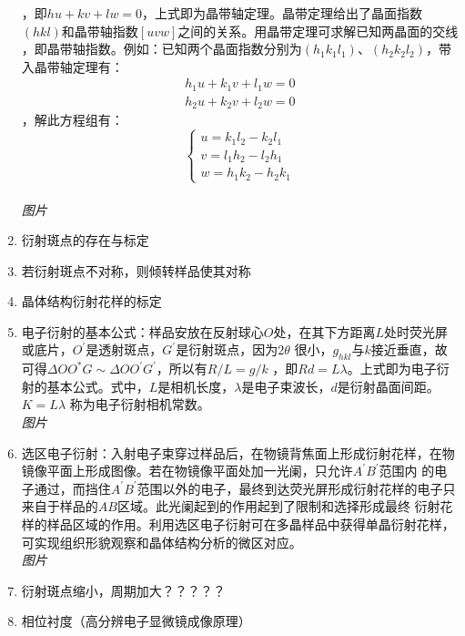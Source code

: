 \documentclass[12pt,a4paper]{article}
\begin{document}
\begin{enumerate}
            ，即$h u+k v+l w=0$，上式即为晶带轴定理。晶带定理给出了晶面指数$(hkl)$和晶带轴指数$[uvw]$之间的关系。用晶带定理可求解已知两晶面的交线
            ，即晶带轴指数。例如：已知两个晶面指数分别为$\left(h_{1} k_{1} l_{1}\right)$、$\left(h_{2} k_{2} l_{2}\right)$，带入晶带轴定理有：
            $$\begin{array}{l}{h_{1} u+k_{1} v+l_{1} w=0} \\ {h_{2} u+k_{2} v+l_{2} w=0}\end{array}$$，解此方程组有：
            $$\left\{\begin{array}{l}{{u}=k_{1} l_{2}-k_{2} l_{1}} \\ {{v}=l_{1} h_{2}-l_{2} h_{1}} \\ {w={h}_{1} k_{
            2}-{h}_{2} {k}_{1}}\end{array}\right.$$   \\\emph{图片}
        \item 衍射斑点的存在与标定
        \item 若衍射斑点不对称，则倾转样品使其对称
        \item 晶体结构衍射花样的标定
        \item 电子衍射的基本公式：样品安放在反射球心$O$处，在其下方距离$L$处时荧光屏或底片，$O^{'}$是透射斑点，$G^{'}$是衍射斑点，因为$2\theta$
            很小，$g_{hkl}$与$k$接近垂直，故可得$\Delta O O^{*} G \sim \Delta O O^{\prime} G^{\prime}$，所以有$R / L=g / k$
            ，即$R d=L \lambda$。上式即为电子衍射的基本公式。式中，$L$是相机长度，$\lambda$是电子束波长，$d$是衍射晶面间距。$K=L\lambda$
            称为电子衍射相机常数。
            \\ \emph{图片}
        \item 选区电子衍射：入射电子束穿过样品后，在物镜背焦面上形成衍射花样，在物镜像平面上形成图像。若在物镜像平面处加一光阑，只允许$A^{'}B^{'}$范围内
            的电子通过，而挡住$A^{'}B^{'}$范围以外的电子，最终到达荧光屏形成衍射花样的电子只来自于样品的$AB$区域。此光阑起到的作用起到了限制和选择形成最终
            衍射花样的样品区域的作用。利用选区电子衍射可在多晶样品中获得单晶衍射花样，可实现组织形貌观察和晶体结构分析的微区对应。
            \\\emph{图片}
        \item 衍射斑点缩小，周期加大？？？？？
        \item 相位衬度（高分辨电子显微镜成像原理）
            

\end{enumerate}
\end{document}
